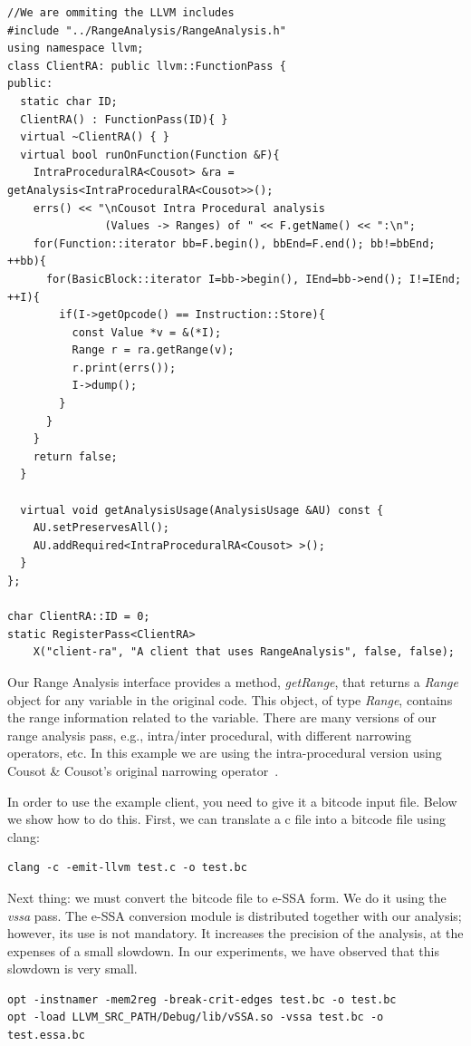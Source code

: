\documentclass{paper}
\begin{document}
\begin{lstlisting}[frame=single]
//We are ommiting the LLVM includes
#include "../RangeAnalysis/RangeAnalysis.h"
using namespace llvm;
class ClientRA: public llvm::FunctionPass {
public:
  static char ID;
  ClientRA() : FunctionPass(ID){ }
  virtual ~ClientRA() { }
  virtual bool runOnFunction(Function &F){
    IntraProceduralRA<Cousot> &ra = getAnalysis<IntraProceduralRA<Cousot>>();
    errs() << "\nCousot Intra Procedural analysis 
               (Values -> Ranges) of " << F.getName() << ":\n";
    for(Function::iterator bb=F.begin(), bbEnd=F.end(); bb!=bbEnd; ++bb){
      for(BasicBlock::iterator I=bb->begin(), IEnd=bb->end(); I!=IEnd; ++I){
        if(I->getOpcode() == Instruction::Store){
          const Value *v = &(*I);
          Range r = ra.getRange(v);
          r.print(errs());
          I->dump();
        }
      }
    }
    return false;
  }

  virtual void getAnalysisUsage(AnalysisUsage &AU) const {
    AU.setPreservesAll();
    AU.addRequired<IntraProceduralRA<Cousot> >();
  }
};

char ClientRA::ID = 0;
static RegisterPass<ClientRA> 
	X("client-ra", "A client that uses RangeAnalysis", false, false);
\end{lstlisting}

Our Range Analysis interface provides a method, \textit{getRange}, that returns
a \textit{Range} object for any variable in the original code.
This object, of type \textit{Range}, contains the range information related to
the variable.
There are many versions of our range analysis pass, e.g., intra/inter procedural,
with different narrowing operators, etc.
In this example we are using the intra-procedural version using
Cousot \& Cousot's original narrowing operator~\cite{Cousot77}.

In order to use the example client, you need to give it a bitcode input file. Below we show how to do this.
First, we can translate a c file into a bitcode file using clang:
\begin{lstlisting}[frame=single]
clang -c -emit-llvm test.c -o test.bc
\end{lstlisting}
Next thing: we must convert the bitcode file to e-SSA form.
We do it using the \textit{vssa} pass.
The e-SSA conversion module is distributed together with our analysis; however,
its use is not mandatory.
It increases the precision of the analysis, at the expenses of a small slowdown.
In our experiments, we have observed that this slowdown is very small.
\begin{lstlisting}[frame=single]
opt -instnamer -mem2reg -break-crit-edges test.bc -o test.bc
opt -load LLVM_SRC_PATH/Debug/lib/vSSA.so -vssa test.bc -o test.essa.bc
\end{lstlisting}
\end{document}
